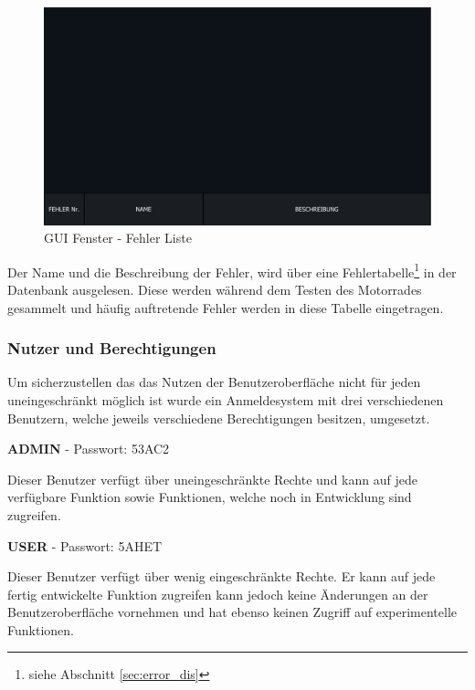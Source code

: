 \begin{figure}[H]
	\begin{center}
		\includegraphics[scale=0.25]{figures/hcis/window_error.png}
			\caption{GUI Fenster - Fehler Liste}
			\label{fig:pageError}
	\end{center}
\end{figure}

Der Name und die Beschreibung der Fehler, wird über eine Fehlertabelle\footnote{siehe Abschnitt \ref{sec:error_dis} } in der Datenbank ausgelesen. Diese werden während dem Testen des Motorrades gesammelt und häufig auftretende Fehler werden in diese Tabelle eingetragen. 

\subsubsection{Nutzer und Berechtigungen} \label{sec:users}

Um sicherzustellen das das Nutzen der Benutzeroberfläche nicht für jeden uneingeschränkt möglich ist wurde ein Anmeldesystem mit drei verschiedenen Benutzern, welche jeweils verschiedene Berechtigungen besitzen, umgesetzt.

{\small \textbf{ADMIN}} - Passwort: 53AC2\\ \vspace{2mm}


Dieser Benutzer verfügt über uneingeschränkte Rechte und kann auf jede verfügbare Funktion sowie Funktionen, welche noch in Entwicklung sind zugreifen.

{\small \textbf{USER}} - Passwort: 5AHET\\ \vspace{2mm}

Dieser Benutzer verfügt über wenig eingeschränkte Rechte. Er kann auf jede fertig entwickelte Funktion zugreifen kann jedoch keine Änderungen an der Benutzeroberfläche vornehmen und hat ebenso keinen Zugriff auf experimentelle Funktionen.


